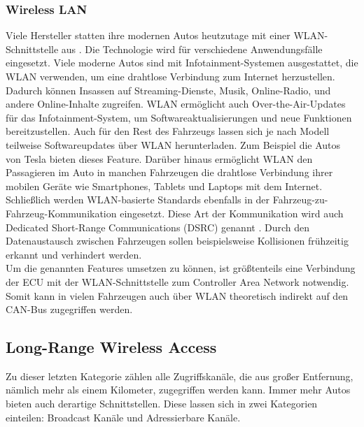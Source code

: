 \subsubsection{Wireless LAN}
Viele Hersteller statten ihre modernen Autos heutzutage mit einer \ac{WLAN}-Schnittstelle aus \cite[4]{Checkoway.2011}. Die Technologie wird für verschiedene Anwendungsfälle eingesetzt. Viele moderne Autos sind mit Infotainment-Systemen ausgestattet, die WLAN verwenden, um eine drahtlose Verbindung zum Internet herzustellen. Dadurch können Insassen auf Streaming-Dienste, Musik, Online-Radio, und andere Online-Inhalte zugreifen. \acs{WLAN} ermöglicht auch Over-the-Air-Updates für das Infotainment-System, um Softwareaktualisierungen und neue Funktionen bereitzustellen. Auch für den Rest des Fahrzeugs lassen sich je nach Modell teilweise Softwareupdates über \acs{WLAN} herunterladen. Zum Beispiel die Autos von Tesla bieten dieses Feature. Darüber hinaus ermöglicht \acs{WLAN} den Passagieren im Auto in manchen Fahrzeugen die drahtlose Verbindung ihrer mobilen Geräte wie Smartphones, Tablets und Laptops mit dem Internet.
Schließlich werden \acs{WLAN}-basierte Standards ebenfalls in der Fahrzeug-zu-Fahrzeug-Kommunikation eingesetzt. Diese Art der Kommunikation wird auch Dedicated Short-Range Communications (DSRC) genannt \cite[4]{Checkoway.2011}. Durch den Datenaustausch zwischen Fahrzeugen sollen beispielsweise Kollisionen frühzeitig erkannt und verhindert werden. \\
Um die genannten Features umsetzen zu können, ist größtenteils eine Verbindung der \acs{ECU} mit der \acs{WLAN}-Schnittstelle zum Controller Area Network notwendig. Somit kann in vielen Fahrzeugen auch über \acs{WLAN} theoretisch indirekt auf den \acs{CAN}-Bus zugegriffen werden.



\subsection{Long-Range Wireless Access}
Zu dieser letzten Kategorie zählen alle Zugriffskanäle, die aus großer Entfernung, nämlich mehr als einem Kilometer, zugegriffen werden kann. Immer mehr Autos bieten auch derartige Schnittstellen. Diese lassen sich in zwei Kategorien einteilen: Broadcast Kanäle und Adressierbare Kanäle. \cite[4]{Checkoway.2011}

